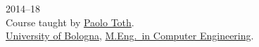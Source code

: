 \begin{paracol}{2}
  \textsc{2014--18}
\switchcolumn
  \\
  Course taught by \href{https://scholar.google.com/citations?user=2IPL4XIAAAAJ}{Paolo Toth}.\\
  \href{https://www.unibo.it}{University of Bologna}, \href{https://corsi.unibo.it/magistrale/ingegneriainformatica}{M.Eng.\ in Computer Engineering}.
\end{paracol}